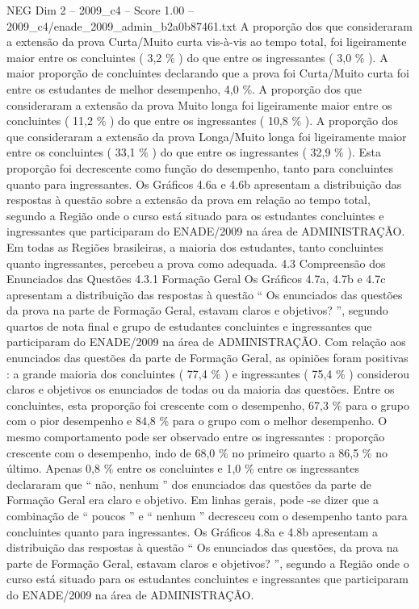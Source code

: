 \begin{textsample}{NEG Dim 2 – 2009\_c4 – Score 1.00 – 2009\_c4/enade\_2009\_admin\_b2a0b87461.txt}
A proporção dos que consideraram a extensão da prova Curta/Muito curta vis-à-vis ao tempo total, foi ligeiramente maior entre os concluintes ( 3,2 \% ) do que entre os ingressantes ( 3,0 \% ).
A maior proporção de concluintes declarando que a prova foi Curta/Muito curta foi entre os estudantes de melhor desempenho, 4,0 \%.
A proporção dos que consideraram a extensão da prova Muito longa foi ligeiramente maior entre os concluintes ( 11,2 \% ) do que entre os ingressantes ( 10,8 \% ).
A proporção dos que consideraram a extensão da prova Longa/Muito longa foi ligeiramente maior entre os concluintes ( 33,1 \% ) do que entre os ingressantes ( 32,9 \% ).
Esta proporção foi decrescente como função do desempenho, tanto para concluintes quanto para ingressantes.
Os Gráficos 4.6a e 4.6b apresentam a distribuição das respostas à questão sobre a extensão da prova em relação ao tempo total, segundo a Região onde o curso está situado para os estudantes concluintes e ingressantes que participaram do ENADE/2009 na área de ADMINISTRAÇÃO.
Em todas as Regiões brasileiras, a maioria dos estudantes, tanto concluintes quanto ingressantes, percebeu a prova como adequada. 4.3 Compreensão dos Enunciados das Questões 4.3.1 Formação Geral Os Gráficos 4.7a, 4.7b e 4.7c apresentam a distribuição das respostas à questão “ Os enunciados das questões da prova na parte de Formação Geral, estavam claros e objetivos? ”, segundo quartos de nota final e grupo de estudantes concluintes e ingressantes que participaram do ENADE/2009 na área de ADMINISTRAÇÃO.
Com relação aos enunciados das questões da parte de Formação Geral, as opiniões foram positivas : a grande maioria dos concluintes ( 77,4 \% ) e ingressantes ( 75,4 \% ) considerou claros e objetivos os enunciados de todas ou da maioria das questões.
Entre os concluintes, esta proporção foi crescente com o desempenho, 67,3 \% para o grupo com o pior desempenho e 84,8 \% para o grupo com o melhor desempenho.
O mesmo comportamento pode ser observado entre os ingressantes : proporção crescente com o desempenho, indo de 68,0 \% no primeiro quarto a 86,5 \% no último.
Apenas 0,8 \% entre os concluintes e 1,0 \% entre os ingressantes declararam que “ não, nenhum ” dos enunciados das questões da parte de Formação Geral era claro e objetivo.
Em linhas gerais, pode -se dizer que a combinação de “ poucos ” e “ nenhum ” decresceu com o desempenho tanto para concluintes quanto para ingressantes.
Os Gráficos 4.8a e 4.8b apresentam a distribuição das respostas à questão “ Os enunciados das questões, da prova na parte de Formação Geral, estavam claros e objetivos? ”, segundo a Região onde o curso está situado para os estudantes concluintes e ingressantes que participaram do ENADE/2009 na área de ADMINISTRAÇÃO.

\end{textsample}
